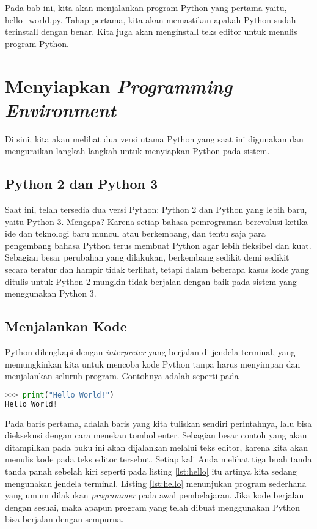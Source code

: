 Pada bab ini, kita akan menjalankan program Python yang pertama yaitu, hello\_world.py. Tahap pertama, kita akan memastikan apakah Python sudah terinstall dengan benar. Kita juga akan menginstall teks editor untuk menulis program Python.
\section{Menyiapkan \textit{Programming Environment}}
Di sini, kita akan melihat dua versi utama Python yang saat ini digunakan dan menguraikan langkah-langkah untuk menyiapkan Python pada sistem.
\subsection{Python 2 dan Python 3}

Saat ini, telah tersedia dua versi Python: Python 2 dan Python yang lebih baru, yaitu Python 3. Mengapa? Karena setiap bahasa pemrograman berevolusi ketika ide dan teknologi baru muncul atau berkembang, dan tentu saja para pengembang bahasa Python terus membuat Python agar lebih fleksibel dan kuat. Sebagian besar perubahan yang dilakukan, berkembang sedikit demi sedikit secara teratur dan hampir tidak terlihat, tetapi dalam beberapa kasus kode yang ditulis untuk Python 2 mungkin tidak berjalan dengan baik pada sistem yang menggunakan Python 3.
\subsection{Menjalankan Kode}

Python dilengkapi dengan \textit{interpreter} yang berjalan di jendela terminal, yang memungkinkan kita untuk mencoba kode Python tanpa harus menyimpan dan menjalankan seluruh program. Contohnya adalah seperti pada
\begin{lstlisting}[language=Python, label={lst:hello}, caption=Kode Pada Jendela Terminal]
>>> print("Hello World!")
Hello World!
\end{lstlisting}
Pada baris pertama, adalah baris yang kita tuliskan sendiri perintahnya, lalu bisa dieksekusi dengan cara menekan tombol enter. Sebagian besar contoh yang akan ditampilkan pada buku ini akan dijalankan melalui teks editor, karena kita akan menulis kode pada teks editor tersebut. Setiap kali Anda melihat tiga buah tanda tanda panah sebelah kiri seperti pada listing \ref{lst:hello} itu artinya kita sedang mengunakan jendela terminal. Listing \ref{lst:hello} menunjukan program sederhana yang umum dilakukan \textit{programmer} pada awal pembelajaran. Jika kode berjalan dengan sesuai, maka apapun program yang telah dibuat menggunakan Python bisa berjalan dengan sempurna.
